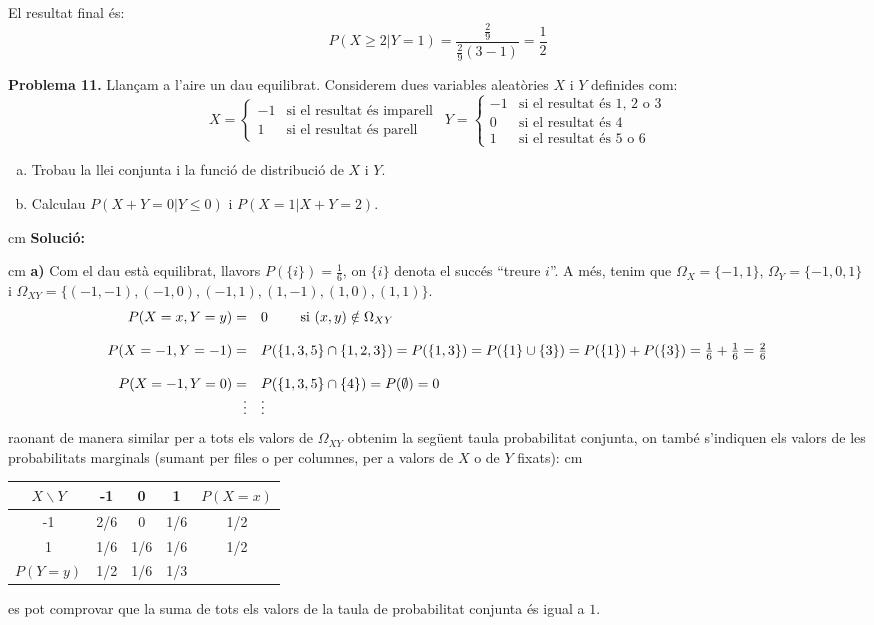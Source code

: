 \documentclass{article}
\begin{document}
\noindent
El resultat final \'es:
\[
P(X \geq 2 | Y=1)= \frac{\frac{2}{9}}{\frac{2}{9} (3-1)}=\frac{1}{2}
\]



\newpage
\noindent
\textbf{Problema 11.}
Llan\c{c}am a l'aire un dau equilibrat. Considerem dues variables
aleat\`ories $X$ i $Y$ definides com:
\[
X = \begin{cases}-1 & \text{si el resultat \'es imparell}\\ 
1 & \text{si el resultat \'es parell} \end{cases} \ \ 
Y = \begin{cases}-1 & \text{si el resultat \'es 1, 2 o 3}\\
0 & \text{si el resultat \'es 4}\\ 
1 & \text{si el resultat \'es 5 o 6}\end{cases}
\]
\begin{enumerate}[a)]
\item Trobau la llei conjunta i la funci\'o de distribuci\'o de $X$
i $Y$.
\item Calculau $P(X + Y = 0 | Y \leq 0)$  i
$P(X = 1 | X + Y = 2)$. 
\end{enumerate}

 cm
\noindent
\textbf{Soluci\'o:}

 cm
\noindent
\textbf{a)} Com el dau est\`a equilibrat, llavors $P(\{i\})=\frac{1}{6}$, on $\{i\}$ denota
el succ\'es ``treure $i$''. A m\'es, tenim que $\Omega_X=\{-1, 1\}$, $\Omega_Y=\{-1, 0, 1\}$ i 
$\Omega_{XY}=\{(-1, -1), (-1, 0), (-1, 1), (1, -1), (1, 0), (1, 1)\}$.
\[
\begin{array}{rl}
P(X=x, Y=y)=& 0 $\qquad$ \text{ si } (x, y) \notin \Omega_{XY}\\ \\
P(X=-1, Y=-1)=& P(\{1, 3, 5\} \cap \{1, 2, 3\})=P(\{1, 3\})=P(\{1\} \cup \{ 3\})=P(\{1\})+P(\{3\})=
\frac{1}{6}+\frac{1}{6}=\frac{2}{6} \\ \\
P(X=-1, Y=0)=& P(\{1, 3, 5\} \cap \{4\})=P(\emptyset)=0 \\
\vdots & \vdots
\end{array}
\]
\noindent
raonant de manera similar per a tots els valors de $\Omega_{XY}$ obtenim la seg\"uent taula 
probabilitat conjunta, on tamb\'e s'indiquen els valors de les probabilitats marginals
(sumant per files o per columnes, per a valors de $X$ o de $Y$ fixats):
\vskip 0.2 cm
\begin{center}
\begin{tabular}{c|c|c|c||c}
$X \backslash Y$ & -1 & 0 & 1 & $P(X=x)$ \\ \hline
-1 & 2/6 & 0 & 1/6 & 1/2 \\ \hline
1 & 1/6 & 1/6 & 1/6 & 1/2 \\ \hline \hline
$P(Y=y)$ & 1/2 & 1/6 & 1/3
\end{tabular}
\end{center}
\noindent
es pot comprovar que la suma de tots els valors de la taula de probabilitat conjunta \'es igual a $1$.
\end{document}
